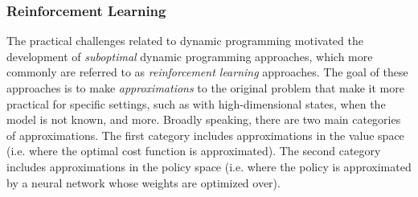 \subsubsection{Reinforcement Learning}
The practical challenges related to dynamic programming motivated the development of \textit{suboptimal} dynamic programming approaches, which more commonly are referred to as \textit{reinforcement learning} approaches. The goal of these approaches is to make \textit{approximations} to the original problem that make it more practical for specific settings, such as with high-dimensional states, when the model is not known, and more. Broadly speaking, there are two main categories of approximations. The first category includes approximations in the value space (i.e. where the optimal cost function is approximated). The second category includes approximations in the policy space (i.e. where the policy is approximated by a neural network whose weights are optimized over).


